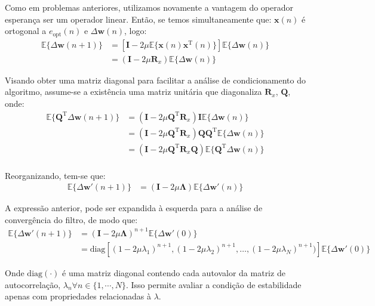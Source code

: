 Como em problemas anteriores, utilizamos novamente a vantagem do operador esperança ser um operador linear. Então, se temos simultaneamente que: $\mathbf{x}(n)$ é ortogonal a $e_{\text{opt}}(n)$ e $\Delta \mathbf{w}(n)$, logo:
\begin{align*}
    \mathbb{E}\{\Delta \mathbf{w}(n + 1)\} &= \left[ \mathbf{I} - 2 \mu \mathbb{E}\{\mathbf{x}(n) \mathbf{x}^{\text{T}}(n)\} \right] \mathbb{E}\{\Delta \mathbf{w}(n)\} \\
    &= \left( \mathbf{I} - 2 \mu \mathbf{R}_{x} \right) \mathbb{E}\{\Delta \mathbf{w}(n)\}
\end{align*}

Visando obter uma matriz diagonal para facilitar a análise de condicionamento do algoritmo, assume-se a existência uma matriz unitária que diagonaliza $\mathbf{R}_{x}$, $\mathbf{Q}$, onde:
\begin{align*}
    \mathbb{E}\{ \mathbf{Q}^{\text{T}} \Delta \mathbf{w}(n + 1) \} &= \left( \mathbf{I} - 2 \mu \mathbf{Q}^{\text{T}} \mathbf{R}_{x} \right) \mathbf{I} \mathbb{E}\{ \Delta \mathbf{w}(n)\} \\
    &= \left( \mathbf{I} - 2 \mu \mathbf{Q}^{\text{T}} \mathbf{R}_{x} \right) \mathbf{Q} \mathbf{Q}^{\text{T}} \mathbb{E}\{ \Delta \mathbf{w}(n)\} \\
    &= \left( \mathbf{I} - 2 \mu \mathbf{Q}^{\text{T}} \mathbf{R}_{x} \mathbf{Q} \right) \mathbb{E}\{ \mathbf{Q}^{\text{T}} \Delta \mathbf{w}(n)\} \\
\end{align*}

Reorganizando, tem-se que:
\begin{align*}
    \mathbb{E}\{\Delta \mathbf{w}'(n + 1)\} &= \left( \mathbf{I} - 2 \mu \mathbf{\Lambda} \right) \mathbb{E}\{\Delta \mathbf{w}'(n)\}
\end{align*}

A expressão anterior, pode ser expandida à esquerda para a análise de convergência do filtro, de modo que:
\begin{align*}
    \mathbb{E}\{ \Delta \mathbf{w}'(n + 1) \} &= \left( \mathbf{I} - 2 \mu \mathbf{\Lambda} \right)^{n + 1} \mathbb{E}\{\Delta \mathbf{w}'(0)\} \\
    &= \text{diag} \left[ (1 - 2 \mu \lambda_{1})^{n + 1}, (1 - 2 \mu \lambda_{2})^{n + 1}, \dots, (1 - 2 \mu \lambda_{N})^{n + 1}) \right] \mathbb{E}\{ \Delta \mathbf{w}'(0)\}
\end{align*}

Onde $\text{diag}(\cdot)$ é uma matriz diagonal contendo cada autovalor da matriz de autocorrelação, $\lambda_{n} \forall n \in \{1, \cdots, N\}$. Isso permite avaliar a condição de estabilidade apenas com propriedades relacionadas à $\lambda$. 

